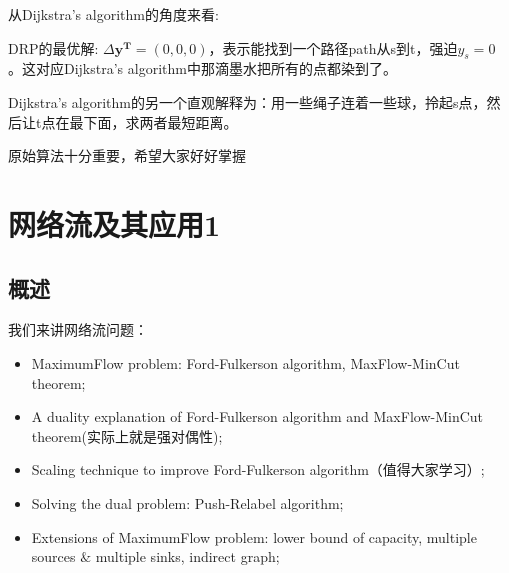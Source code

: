 \documentclass[11pt]{article}
\begin{document}
\begin{CJK}{UTF8}{gbsn}
\begin{figure}[H]
\end{figure}

从Dijkstra's algorithm的角度来看:

DRP的最优解: $\Delta \mathbf{y^T} = (0, 0, 0)$，表示能找到一个路径path从s到t，强迫$y_{s} = 0$  。这对应Dijkstra's algorithm中那滴墨水把所有的点都染到了。

Dijkstra's algorithm的另一个直观解释为：用一些绳子连着一些球，拎起s点，然后让t点在最下面，求两者最短距离。

原始算法十分重要，希望大家好好掌握
\section{网络流及其应用1}
\subsection{概述}
我们来讲网络流问题：
\begin{itemize}
\item {\sc MaximumFlow} problem: {\sc Ford-Fulkerson} algorithm, {\sc MaxFlow-MinCut} theorem;
\item A duality explanation of {\sc Ford-Fulkerson} algorithm and {\sc MaxFlow-MinCut} theorem(实际上就是强对偶性);
\item Scaling technique to improve {\sc Ford-Fulkerson} algorithm（值得大家学习）;
\item Solving the dual problem: Push-Relabel algorithm;
\item Extensions of {\sc MaximumFlow} problem: lower bound of capacity, multiple sources $\&$ multiple sinks, indirect graph;
\end{itemize}

\end{CJK}
\end{document}
